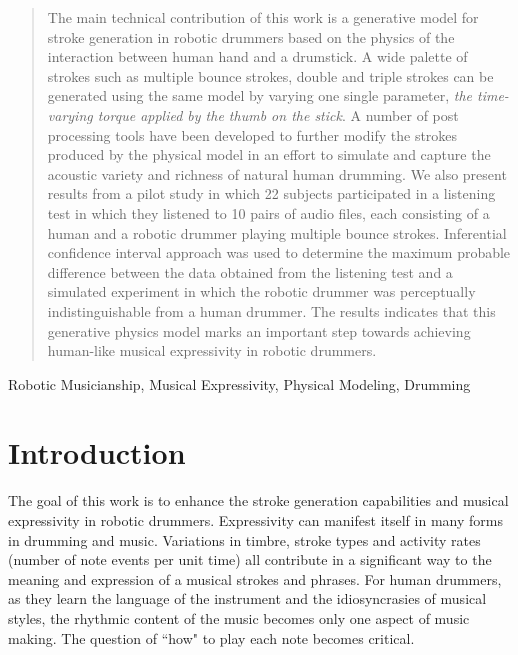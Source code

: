 \documentclass[final,1p,times]{elsarticle}
\begin{document}
\begin{frontmatter}
\begin{abstract}
	The main technical contribution of this work is a generative model for stroke generation in robotic drummers based on the physics of the interaction between human hand and a drumstick. A wide palette of strokes such as multiple bounce strokes, double and triple strokes can be generated using the same model by varying one single parameter, \textit{the time-varying torque applied by the thumb on the stick}. A number of post processing tools have been developed to further modify the strokes produced by the physical model in an effort to simulate and capture the acoustic variety and richness of natural human drumming.
	We also present results from a pilot study in which 22 subjects participated in a listening test in which they listened to 10 pairs of audio files, each consisting of a human and a robotic drummer playing multiple bounce strokes. Inferential confidence interval approach was used to determine the maximum probable difference between the data obtained from the listening test and a simulated experiment in which the robotic drummer was perceptually indistinguishable from a human drummer. The results indicates that this generative physics model marks an important step towards achieving human-like musical expressivity in robotic drummers.
\end{abstract}
\begin{keyword}
	Robotic Musicianship, Musical Expressivity, Physical Modeling, Drumming
\end{keyword}
\end{frontmatter}
\section{Introduction}
The goal of this work is to enhance the stroke generation capabilities and
musical expressivity in robotic drummers. Expressivity can manifest itself
in many forms in drumming and music. Variations in timbre, stroke types
and activity rates (number of note events per unit time) all contribute in
a significant way to the meaning and expression of a musical strokes and
phrases. For human drummers, as they learn the language of the instrument
and the idiosyncrasies of musical styles, the rhythmic content of the music becomes only one aspect of music making. The question of ``how" to play each note becomes critical.
\end{document}
